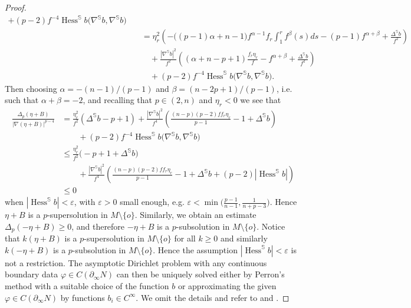 \documentclass[10pt,a4paper,reqno]{amsart}
\newcommand{\Ss}{\mathbb{S}}
\newcommand{\pinf}{\partial_{\infty}}
\DeclareMathOperator\Hess{Hess}
\numberwithin{equation}{section}
\theoremstyle{plain}
\theoremstyle{definition}
\begin{document}
\begin{proof}
\begin{align*}
+ (p-2)f^{-4}\Hess^{\Ss}b\bigl(\nabla^{\Ss}b,\nabla^{\Ss}b\bigr)\\
&\quad =\eta_r^2\left(-\bigl((p-1)\alpha+n-1\bigr)f^{\alpha-1}f_r\int_1^r f^{\beta}(s)ds - (p-1)f^{\alpha+\beta}+\frac{\Delta^{\Ss}b}{f^2}\right)\\
&\qquad + \frac{|\nabla^{\Ss}b|^2}{f^2}\left((\alpha+n-p+1)\frac{f_r\eta_r}{f}
   - f^{\alpha+\beta} + \frac{\Delta^{\Ss}b}{f^2}\right)\\
&\qquad +(p-2)f^{-4}\Hess^{\Ss}b\bigl(\nabla^{\Ss}b,\nabla^{\Ss}b\bigr).   
 \end{align*}
Then choosing $\alpha = -(n-1)/(p-1)$ and $\beta = (n-2p+1)/(p-1)$, i.e. such that $\alpha + \beta=-2$,
and recalling that $p\in(2,n)$ and $\eta_r<0$ we see that
\begin{align*}
 \frac{\Delta_p (\eta +B)}{|\nabla (\eta +B)|^{p-4}} & = 
 \frac{\eta_r^2}{f^2}(\Delta^{\Ss}b-p+1) + \frac{|\nabla^{\Ss}b|^2}{f^4}\left( \frac{(n-p)(p-2)ff_r\eta_r}{p-1}- 1 +\Delta^{\Ss}b\right)\\
&\qquad +(p-2)f^{-4}\Hess^{\Ss}b\bigl(\nabla^{\Ss}b,\nabla^{\Ss}b\bigr) \\  
&\le \frac{\eta_r^2}{f^2}\big(-p+1+\Delta^{\Ss}b\big)\\
&\qquad + \frac{|\nabla^{\Ss}b|^2}{f^4}\left( \frac{(n-p)(p-2)ff_r\eta_r}{p-1}- 1 +\Delta^{\Ss}b
+(p-2)|\Hess^{\Ss}b|\right)\\
& \le 0
\end{align*}
when $|\Hess^{\Ss}b|<\varepsilon$, with $\varepsilon>0$ small enough, e.g.     
$\varepsilon<\min\bigl(\tfrac{p-1}{n-1},\tfrac{1}{n+p-3}\bigr)$.
Hence $\eta + B$ is a $p$-supersolution in $M\setminus\{o\}$. Similarly, we obtain an estimate $\Delta_p(-\eta+ B)\ge 0$,
and therefore $-\eta+B$ is a $p$-subsolution in $M\setminus\{o\}$. Notice that $k(\eta+B)$ is a $p$-supersolution in $M\setminus\{o\}$ for 
all $k\ge 0$ and similarly $k(-\eta+B)$ is a $p$-subsolution in $M\setminus\{o\}$. Hence the assumption $|\Hess^{\Ss}b|<\varepsilon$ is not a restriction.
The asymptotic Dirichlet problem with any continuous boundary data $\varphi\in C(\pinf N)$ can then be uniquely solved either by Perron's method with a 
suitable choice of the function $b$ or approximating the given $\varphi\in C(\pinf N)$ by functions $b_i\in C^{\infty}$. We omit the details and refer 
to \cite{Va1} and \cite{Ho}.
\end{proof}
\end{document}
